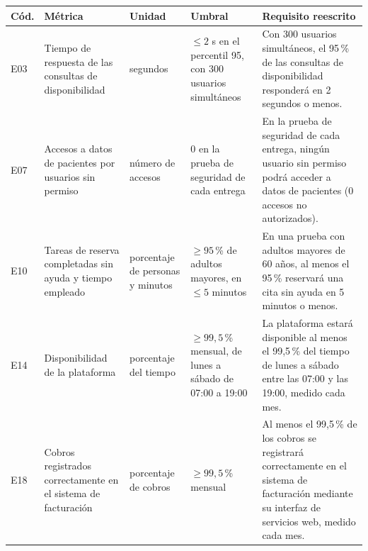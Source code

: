 \documentclass[11pt,a4paper]{article}
\begin{document}
\small
\begin{longtable}{@{}l p{3.3cm} p{2.3cm} p{4.2cm} p{7cm}@{}}
\toprule
\textbf{Cód.} & \textbf{Métrica} & \textbf{Unidad} & \textbf{Umbral} & \textbf{Requisito reescrito} \\
\midrule
\endhead
E03 & Tiempo de respuesta de las consultas de disponibilidad & segundos & $\leq 2$ s en el percentil 95, con 300 usuarios simultáneos & Con 300 usuarios simultáneos, el 95\,\% de las consultas de disponibilidad responderá en 2 segundos o menos. \\
E07 & Accesos a datos de pacientes por usuarios sin permiso & número de accesos & 0 en la prueba de seguridad de cada entrega & En la prueba de seguridad de cada entrega, ningún usuario sin permiso podrá acceder a datos de pacientes (0 accesos no autorizados). \\
E10 & Tareas de reserva completadas sin ayuda y tiempo empleado & porcentaje de personas y minutos & $\geq 95$\,\% de adultos mayores, en $\leq 5$ minutos & En una prueba con adultos mayores de 60 años, al menos el 95\,\% reservará una cita sin ayuda en 5 minutos o menos. \\
E14 & Disponibilidad de la plataforma & porcentaje del tiempo & $\geq 99{,}5$\,\% mensual, de lunes a sábado de 07:00 a 19:00 & La plataforma estará disponible al menos el 99,5\,\% del tiempo de lunes a sábado entre las 07:00 y las 19:00, medido cada mes. \\
E18 & Cobros registrados correctamente en el sistema de facturación & porcentaje de cobros & $\geq 99{,}5$\,\% mensual & Al menos el 99,5\,\% de los cobros se registrará correctamente en el sistema de facturación mediante su interfaz de servicios web, medido cada mes. \\
\bottomrule
\end{longtable}
\normalsize
\end{document}
